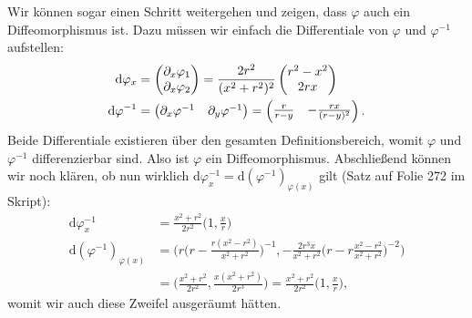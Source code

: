 \begin{Beispiel}
    Wir können sogar einen Schritt weitergehen und zeigen, dass $\varphi$ auch ein Diffeomorphismus ist. Dazu müssen wir einfach die Differentiale von $\varphi$ und $\varphi^{-1}$ aufstellen:
    \begin{align*}
        \text{d}\varphi_x&=\begin{pmatrix}\partial_x\varphi_1 \\ \partial_x\varphi_2\end{pmatrix} = \frac{2r^2}{(x^2+r^2)^2}\begin{pmatrix}r^2-x^2 \\ 2rx\end{pmatrix} \\
        \text{d}\varphi^{-1}&=\begin{pmatrix}\partial_x\varphi^{-1} & \partial_y \varphi^{-1}\end{pmatrix}=\begin{pmatrix}\frac{r}{r-y} & -\frac{rx}{(r-y)^2}\end{pmatrix}.
    \end{align*}
    Beide Differentiale existieren über den gesamten Definitionsbereich, womit $\varphi$
    und $\varphi^{-1}$ differenzierbar sind. Also ist $\varphi$ ein Diffeomorphismus. Abschließend können wir noch klären, ob nun wirklich d$\varphi^{-1}_x = \text{d}(\varphi^{-1})_{\varphi(x)}$ gilt (Satz auf Folie 272 im Skript):
    \begin{align*}
        \text{d}\varphi_x^{-1}&=\frac{x^2+r^2}{2r^2}\big( 1, \frac{x}{r} \big) \\
        \text{d}(\varphi^{-1})_{\varphi(x)}&=\Big( r\big(r-\frac{r(x^2-r^2)}{x^2+r^2} \big)^{-1}, -\frac{2r^3x}{x^2+r^2}\big( r-r\frac{x^2-r^2}{x^2+r^2} \big)^{-2} \Big) \\ &= \Big( \frac{x^2+r^2}{2r^2}, \frac{x(x^2+r^2)}{2r^3} \Big) = \frac{x^2+r^2}{2r^2}\big( 1, \frac{x}{r} \big),
    \end{align*}
    womit wir auch diese Zweifel ausgeräumt hätten.

\end{Beispiel}


